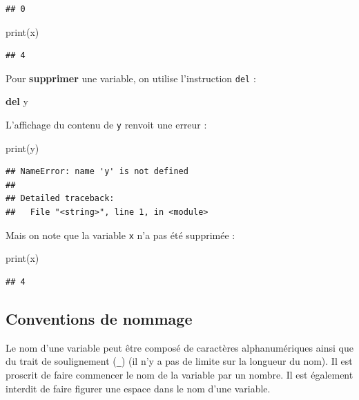 \documentclass[12pt,]{book}
\newenvironment{Shaded}{\begin{snugshade}}{\end{snugshade}}
\newcommand{\KeywordTok}[1]{\textcolor[rgb]{0.13,0.29,0.53}{\textbf{#1}}}
\newcommand{\BuiltInTok}[1]{#1}
\newcommand{\NormalTok}[1]{#1}
\numberwithin{equation}{section}
\numberwithin{countremarque}{section}
\begin{document}
\begin{lstlisting}
## 0
\end{lstlisting}

\begin{Shaded}
\begin{Highlighting}[]
\BuiltInTok{print}\NormalTok{(x)}
\end{Highlighting}
\end{Shaded}

\begin{lstlisting}
## 4
\end{lstlisting}

Pour \textbf{supprimer} une variable, on utilise l'instruction
\texttt{del} :

\begin{Shaded}
\begin{Highlighting}[]
\KeywordTok{del}\NormalTok{ y}
\end{Highlighting}
\end{Shaded}

L'affichage du contenu de \texttt{y} renvoit une erreur :

\begin{Shaded}
\begin{Highlighting}[]
\BuiltInTok{print}\NormalTok{(y)}
\end{Highlighting}
\end{Shaded}

\begin{lstlisting}
## NameError: name 'y' is not defined
## 
## Detailed traceback: 
##   File "<string>", line 1, in <module>
\end{lstlisting}

Mais on note que la variable \texttt{x} n'a pas été supprimée :

\begin{Shaded}
\begin{Highlighting}[]
\BuiltInTok{print}\NormalTok{(x)}
\end{Highlighting}
\end{Shaded}

\begin{lstlisting}
## 4
\end{lstlisting}

\subsection{Conventions de nommage}\label{conventions-de-nommage}

Le nom d'une variable peut être composé de caractères alphanumériques
ainsi que du trait de soulignement (\texttt{\_}) (il n'y a pas de limite
sur la longueur du nom). Il est proscrit de faire commencer le nom de la
variable par un nombre. Il est également interdit de faire figurer une
espace dans le nom d'une variable.
\end{document}

